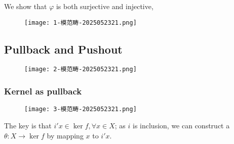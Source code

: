We show that $\varphi$ is both surjective and injective,

\begin{figure}[H]
\centering
\texttt{[image: 1-模范畴-2025052321.png]}
\label{}
\end{figure}

\subsection{Pullback and Pushout}

\begin{figure}[H]
\centering
\texttt{[image: 2-模范畴-2025052321.png]}
\label{}
\end{figure}

\subsubsection{Kernel as pullback}

\begin{figure}[H]
\centering
\texttt{[image: 3-模范畴-2025052321.png]}
\label{}
\end{figure}

The key is that $i'x\in \ker f,\forall x\in X$; as $i$ is inclusion, we can construct a $\theta:X\to \ker f$ by mapping $x$ to $i'x$.
